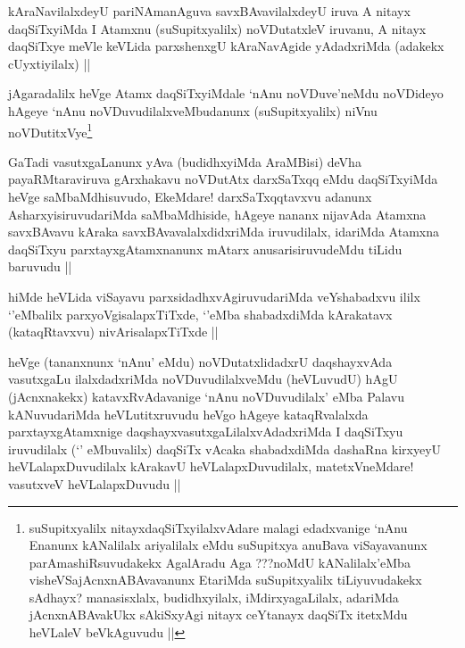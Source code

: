 \begin{artha}
kAraNavilalxdeyU pariNAmanAguva savxBAvavilalxdeyU iruva A nitayx daqSiTxyiMda I Atamxnu (suSupitxyalilx) noVDutatxleV iruvanu, A nitayx daqSiTxye meVle keVLida parxshenxgU kAraNavAgide yAdadxriMda (adakekx cUyxtiyilalx) ||
\end{artha}


\begin{artha}
jAgaradalilx heVge Atamx daqSiTxyiMdale `nAnu noVDuve'neMdu noVDideyo hAgeye `nAnu noVDuvudilalxveMbudanunx (suSupitxyalilx) niVnu noVDutitxVye\footnote{suSupitxyalilx nitayxdaqSiTxyilalxvAdare malagi edadxvanige `nAnu Enanunx kANalilalx ariyalilalx eMdu suSupitxya anuBava viSayavanunx parAmashiRsuvudakekx AgalAradu Aga ???noMdU kANalilalx'eMba visheVSajAcnxnABAvavanunx EtariMda suSupitxyalilx tiLiyuvudakekx sAdhayx? manasisxlalx, budidhxyilalx, iMdirxyagaLilalx, adariMda jAcnxnABAvakUkx sAkiSxyAgi nitayx ceYtanayx daqSiTx itetxMdu heVLaleV beVkAguvudu ||} 
\end{artha}


\begin{artha}
GaTadi vasutxgaLanunx yAva (budidhxyiMda AraMBisi) deVha payaRMtaraviruva gArxhakavu noVDutAtx darxSaTxqq eMdu daqSiTxyiMda heVge saMbaMdhisuvudo, EkeMdare! darxSaTxqqtavxvu adanunx AsharxyisiruvudariMda saMbaMdhiside, hAgeye nananx nijavAda Atamxna savxBAvavu kAraka savxBAvavalalxdidxriMda iruvudilalx, idariMda Atamxna daqSiTxyu parxtayxgAtamxnanunx mAtarx anusarisiruvudeMdu tiLidu baruvudu ||
\end{artha}

\begin{artha}
hiMde heVLida viSayavu parxsidadhxvAgiruvudariMda veYshabadxvu ililx `\stext'eMbalilx parxyoVgisalapxTiTxde, `\stext'eMba shabadxdiMda kArakatavx (kataqRtavxvu) nivArisalapxTiTxde ||
\end{artha}

\begin{artha}
heVge (tananxnunx `nAnu' eMdu) noVDutatxlidadxrU daqshayxvAda vasutxgaLu ilalxdadxriMda noVDuvudilalxveMdu (heVLuvudU) hAgU (jAcnxnakekx) katavxRvAdavanige `nAnu noVDuvudilalx' eMba Palavu kANuvudariMda heVLutitxruvudu heVgo hAgeye kataqRvalalxda parxtayxgAtamxnige daqshayxvasutxgaLilalxvAdadxriMda I daqSiTxyu iruvudilalx (`\stext' eMbuvalilx) daqSiTx vAcaka shabadxdiMda dashaRna kirxyeyU heVLalapxDuvudilalx kArakavU heVLalapxDuvudilalx, matetxVneMdare! vasutxveV heVLalapxDuvudu ||
\end{artha}

